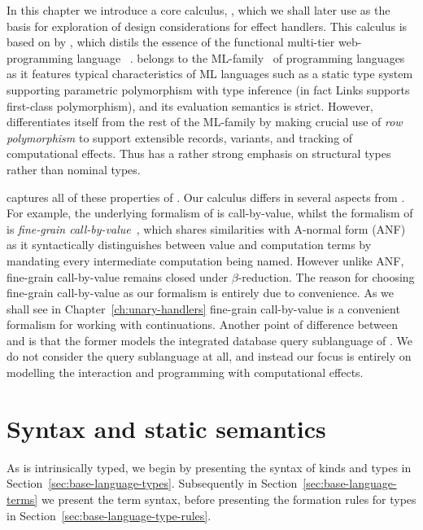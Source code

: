 \documentclass[12pt,phd,lfcs,twoside,openright,logo,leftchapter,normalheadings]{infthesis}
\theoremstyle{plain}
\theoremstyle{definition}
\begin{document}
In this chapter we introduce a core calculus, \BCalc{}, which we shall
later use as the basis for exploration of design considerations for
effect handlers. This calculus is based on \CoreLinks{} by
\citet{LindleyC12}, which distils the essence of the functional
multi-tier web-programming language
\Links{}~\cite{CooperLWY06}. \Links{} belongs to the
ML-family~\cite{MilnerTHM97} of programming languages as it features
typical characteristics of ML languages such as a static type system
supporting parametric polymorphism with type inference (in fact Links
supports first-class polymorphism), and its evaluation semantics is
strict. However, \Links{} differentiates itself from the rest of the
ML-family by making crucial use of \emph{row polymorphism} to support
extensible records, variants, and tracking of computational
effects. Thus \Links{} has a rather strong emphasis on structural
types rather than nominal types.

\CoreLinks{} captures all of these properties of \Links{}. Our
calculus \BCalc{} differs in several aspects from \CoreLinks{}. For
example, the underlying formalism of \CoreLinks{} is call-by-value,
whilst the formalism of \BCalc{} is \emph{fine-grain
  call-by-value}~\cite{LevyPT03}, which shares similarities with
A-normal form (ANF)~\cite{FlanaganSDF93} as it syntactically
distinguishes between value and computation terms by mandating every
intermediate computation being named. However unlike ANF, fine-grain
call-by-value remains closed under $\beta$-reduction. The reason for
choosing fine-grain call-by-value as our formalism is entirely due to
convenience. As we shall see in Chapter~\ref{ch:unary-handlers}
fine-grain call-by-value is a convenient formalism for working with
continuations. Another point of difference between \CoreLinks{} and
\BCalc{} is that the former models the integrated database query
sublanguage of \Links{}. We do not consider the query sublanguage at
all, and instead our focus is entirely on modelling the interaction
and programming with computational effects.

\section{Syntax and static semantics}
\label{sec:syntax-base-language}

As \BCalc{} is intrinsically typed, we begin by presenting the syntax
of kinds and types in
Section~\ref{sec:base-language-types}. Subsequently in
Section~\ref{sec:base-language-terms} we present the term syntax,
before presenting the formation rules for types in
Section~\ref{sec:base-language-type-rules}.
\end{document}
